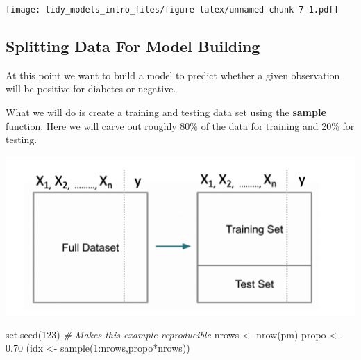 \documentclass[
]{article}
\newenvironment{Shaded}{\begin{snugshade}}{\end{snugshade}}
\newcommand{\CommentTok}[1]{\textcolor[rgb]{0.56,0.35,0.01}{\textit{#1}}}
\newcommand{\DecValTok}[1]{\textcolor[rgb]{0.00,0.00,0.81}{#1}}
\newcommand{\FloatTok}[1]{\textcolor[rgb]{0.00,0.00,0.81}{#1}}
\newcommand{\FunctionTok}[1]{\textcolor[rgb]{0.00,0.00,0.00}{#1}}
\newcommand{\NormalTok}[1]{#1}
\newcommand{\OtherTok}[1]{\textcolor[rgb]{0.56,0.35,0.01}{#1}}
\newcommand{\SpecialCharTok}[1]{\textcolor[rgb]{0.00,0.00,0.00}{#1}}
\begin{document}
\texttt{[image: tidy\_models\_intro\_files/figure-latex/unnamed-chunk-7-1.pdf]}

\hypertarget{splitting-data-for-model-building}{%
\subsection{Splitting Data For Model
Building}\label{splitting-data-for-model-building}}

At this point we want to build a model to predict whether a given
observation will be positive for diabetes or negative.

What we will do is create a training and testing data set using the
\textbf{sample} function. Here we will carve out roughly 80\% of the
data for training and 20\% for testing.

\includegraphics{./IMG/split.png}

\begin{Shaded}
\begin{Highlighting}[]
\FunctionTok{set.seed}\NormalTok{(}\DecValTok{123}\NormalTok{)  }\CommentTok{\# Makes this example reproducible}
\NormalTok{nrows }\OtherTok{\textless{}{-}} \FunctionTok{nrow}\NormalTok{(pm)}
\NormalTok{propo }\OtherTok{\textless{}{-}} \FloatTok{0.70}
\NormalTok{(idx }\OtherTok{\textless{}{-}} \FunctionTok{sample}\NormalTok{(}\DecValTok{1}\SpecialCharTok{:}\NormalTok{nrows,propo}\SpecialCharTok{*}\NormalTok{nrows))}
\end{Highlighting}
\end{Shaded}
\end{document}
